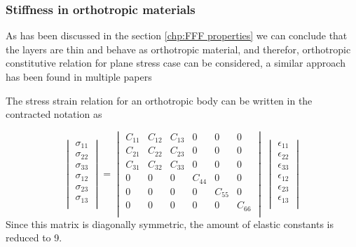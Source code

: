 \subsubsection{Stiffness in orthotropic materials}
As has been discussed in the section \ref{chp:FFF properties} we can conclude that the layers are thin and behave as orthotropic material, and therefor, orthotropic constitutive relation for plane stress case can be considered, a similar approach has been found in multiple papers \cite{Rodrguez2003DesignStrength} \cite{Rodriguez2003MechanicalModeling} \cite{Somireddy2018DevelopmentFDM} 

The stress strain relation for an orthotropic body can be written in the contracted notation as

\begin{equation}\label{eqn:compliancematrix}
\begin{vmatrix}
\sigma_{11}\\
\sigma_{22}\\
\sigma_{33}\\
\sigma_{12}\\
\sigma_{23}\\
\sigma_{13}\\
\end{vmatrix}
=
\begin{vmatrix}
C_{11}&C_{12}&C_{13}&0&0&0\\
C_{21}&C_{22}&C_{23}&0&0&0\\
C_{31}&C_{32}&C_{33}&0&0&0\\
0&0&0&C_{44}&0&0\\
0&0&0&0&C_{55}&0\\
0&0&0&0&0&C_{66}\\
\end{vmatrix}
\
\begin{vmatrix}
\epsilon_{11}\\
\epsilon_{22}\\
\epsilon_{33}\\
\epsilon_{12}\\
\epsilon_{23}\\
\epsilon_{13}\\
\end{vmatrix}
\end{equation}Since this matrix is diagonally symmetric, the amount of elastic constants is reduced to 9.

